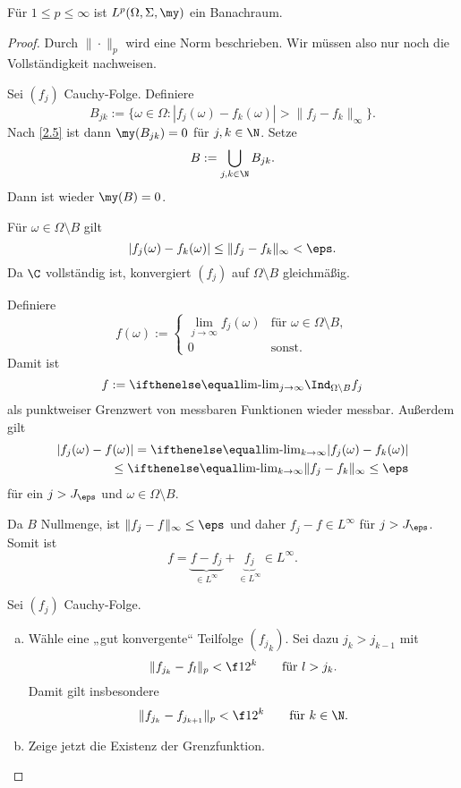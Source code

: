 \begin{st} \label{2.12}
	Für $1 \le p \le \infty$ ist $L^p(\Omega, \Sigma, \my)$ ein Banachraum.
	\begin{proof}
		Durch $\|\cdot\|_p$ wird eine Norm beschrieben.
		Wir müssen also nur noch die Vollständigkeit nachweisen.
		\begin{seg}[$p=\infty$]
			Sei $(f_j)$ Cauchy-Folge.
			Definiere
			\[
				B_{jk} := \Big\{ \omega \in \Omega : |f_j(\omega) - f_k(\omega)| > \|f_j-f_k\|_\infty \Big\}.
			\]
			Nach \ref{2.5} ist dann $\my(B_{jk}) = 0$ für $j,k\in \N$. 
			Setze
			\[
				B := \bigcup_{j,k\in \N} B_{jk}.
			\]
			Dann ist wieder $\my(B) = 0$.

			Für $\omega \in \Omega \setminus B$ gilt
			\[
				|f_j(\omega) - f_k(\omega)| \le \|f_j-f_k\|_\infty < \eps.
			\]
			Da $\C$ vollständig ist, konvergiert $(f_j)$ auf $\Omega \setminus B$ gleichmäßig.

			Definiere
			\[
				f(\omega) := \begin{cases}
					\lim\limits_{j \to \infty} f_j(\omega) & \text{für }\omega \in \Omega \setminus B ,\\
					0 & \text{sonst.}
				\end{cases}
			\]
			Damit ist
			\[
				f := \lim_{j\to \infty} \Ind_{\Omega \setminus B} f_j
			\]
			als punktweiser Grenzwert von messbaren Funktionen wieder messbar.
			Außerdem gilt
			\begin{align*}
				|f_j(\omega) - f(\omega) |
				= \lim_{k\to \infty} |f_j(\omega) - f_k(\omega)| \\
				\le \lim_{k\to \infty} \|f_j - f_k\|_{\infty}
				\le \eps
			\end{align*}
			für ein $j > J_\eps$ und $\omega \in \Omega \setminus B$.

			Da $B$ Nullmenge, ist $\|f_j - f\|_\infty \le \eps$ und daher $f_j - f \in L^\infty$ für $j > J_\eps$.
			Somit ist
			\[
				f = \underbrace{f - f_j}_{\in L^\infty} + \underbrace{f_j}_{\in L^\infty} \in L^\infty.
			\]
		\end{seg}
		\begin{seg}[$1 \le p < \infty$]
			Sei $(f_j)$ Cauchy-Folge.
			\begin{enumerate}[a)]
				\item
					Wähle eine „gut konvergente“ Teilfolge $({f_j}_k)$.
					Sei dazu $j_k > j_{k-1}$ mit
					\[
						\|f_{j_k} - f_l\|_p < \f 1{2^k} \qquad \text{für $l>j_k$}.
					\]
					Damit gilt insbesondere
					\[
						\|f_{j_k} - f_{j_{k+1}} \|_p < \f 1{2^k} \qquad \text{für $k \in \N$}.
					\]
				\item
					Zeige jetzt die Existenz der Grenzfunktion.


\end{enumerate}
\end{seg}
\end{proof}
\end{st}
